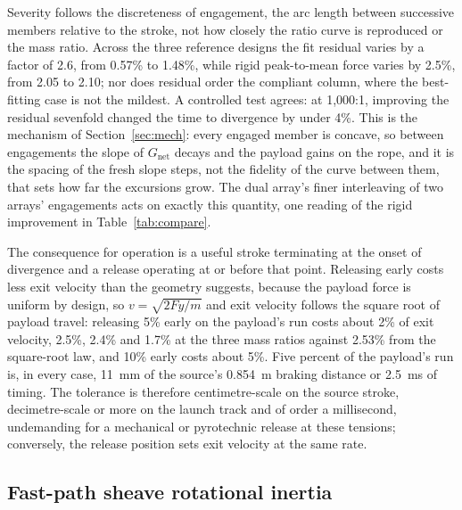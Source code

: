 \documentclass[preprint,12pt,number]{elsarticle}
\newcommand{\Gnet}{G_{\mathrm{net}}}
\newcommand{\ptm}{peak-to-mean}
\begin{document}
Severity follows the discreteness of engagement, the arc length between successive members relative to the stroke, not how closely the ratio curve is reproduced or the mass ratio. Across the three reference designs the fit residual varies by a factor of 2.6, from 0.57\% to 1.48\%, while rigid \ptm{} force varies by 2.5\%, from 2.05 to 2.10; nor does residual order the compliant column, where the best-fitting case is not the mildest. A controlled test agrees: at 1,000:1, improving the residual sevenfold changed the time to divergence by under 4\%. This is the mechanism of Section~\ref{sec:mech}: every engaged member is concave, so between engagements the slope of $\Gnet$ decays and the payload gains on the rope, and it is the spacing of the fresh slope steps, not the fidelity of the curve between them, that sets how far the excursions grow. The dual array's finer interleaving of two arrays' engagements acts on exactly this quantity, one reading of the rigid improvement in Table~\ref{tab:compare}.

The consequence for operation is a useful stroke terminating at the onset of divergence and a release operating at or before that point. Releasing early costs less exit velocity than the geometry suggests, because the payload force is uniform by design, so $v = \sqrt{2Fy/m}$ and exit velocity follows the square root of payload travel: releasing 5\% early on the payload's run costs about 2\% of exit velocity, 2.5\%, 2.4\% and 1.7\% at the three mass ratios against 2.53\% from the square-root law, and 10\% early costs about 5\%. Five percent of the payload's run is, in every case, 11~mm of the source's 0.854~m braking distance or 2.5~ms of timing. The tolerance is therefore centimetre-scale on the source stroke, decimetre-scale or more on the launch track and of order a millisecond, undemanding for a mechanical or pyrotechnic release at these tensions; conversely, the release position sets exit velocity at the same rate.

\subsection{Fast-path sheave rotational inertia}
\label{sec:sheave}
\end{document}
